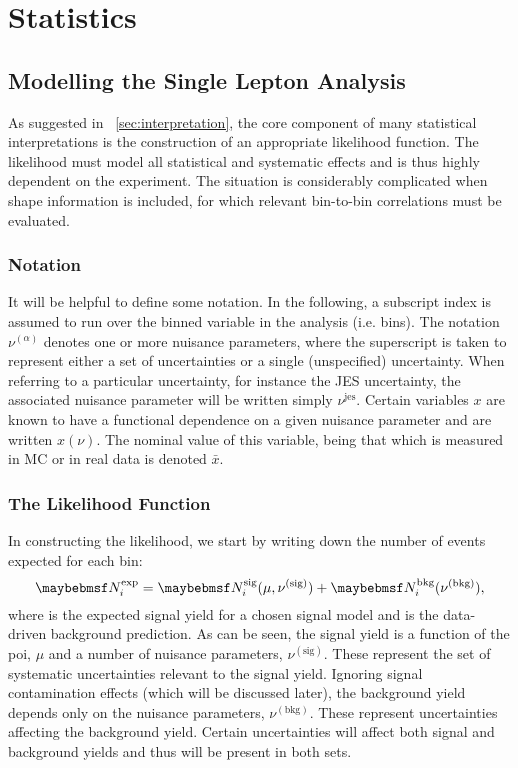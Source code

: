 \chapter{Statistics}
\section{Modelling the Single Lepton Analysis}
\label{sec:inter_1lepton}
As suggested in \chap~\ref{sec:interpretation}, the core component of many
statistical interpretations is the construction of an appropriate likelihood
function. The likelihood must model all statistical and systematic effects and
is thus highly dependent on the experiment. The situation is considerably
complicated when shape information is included, for which relevant bin-to-bin
correlations must be evaluated.

\subsection{Notation}
It will be helpful to define some notation. In the following, a subscript index
is assumed to run over the binned variable in the analysis (i.e. \STlep
bins). The notation $\nu^{(\alpha)}$ denotes one or more nuisance parameters,
where the superscript is taken to represent either a set of uncertainties or a
single (unspecified) uncertainty. When referring to a particular uncertainty,
for instance the \ac{JES} uncertainty, the associated nuisance parameter will be
written simply $\nu^{\textrm{jes}}$. Certain variables $x$ are known to have a
functional dependence on a given nuisance parameter and are written
$x(\nu)$. The nominal value of this variable, being that which is measured in
\ac{MC} or in real data is denoted $\bar{x}$.

\subsection{The Likelihood Function}
In constructing the likelihood, we start by writing down the number of events
expected for each bin:
\begin{equation*}
\NExpi = \NSigi(\mu, \nu^{(\textrm{sig})}) +
\NBkgi(\nu^{(\textrm{bkg})}),
\end{equation*}
where \NSigi is the expected signal yield for a chosen signal model and \NBkgi
is the data-driven background prediction. As can be seen, the signal yield is a
function of the \ac{poi}, $\mu$ and a number of nuisance parameters,
$\nu^{(\textrm{sig})}$. These represent the set of systematic uncertainties
relevant to the signal yield. Ignoring signal contamination effects (which will
be discussed later), the background yield depends only on the nuisance
parameters, $\nu^{(\textrm{bkg})}$. These represent uncertainties affecting the
background yield. Certain uncertainties will affect both signal and background
yields and thus will be present in both sets.

